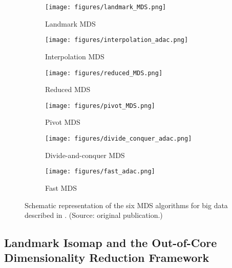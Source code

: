 \begin{figure}[ht]
    \centering
    \captionsetup[subfigure]{labelformat=empty}

    \begin{subfigure}[t]{0.3\textwidth}
        \centering
        \texttt{[image: figures/landmark\_MDS.png]}
        \caption{Landmark MDS}
        \label{fig:landmark_MDS}
    \end{subfigure}
    \hfill
    \begin{subfigure}[t]{0.3\textwidth}
        \centering
        \texttt{[image: figures/interpolation\_adac.png]}
        \caption{Interpolation MDS}
        \label{fig:interpolation_MDS}
    \end{subfigure}
    \hfill
    \begin{subfigure}[t]{0.3\textwidth}
        \centering
        \texttt{[image: figures/reduced\_MDS.png]}
        \caption{Reduced MDS}
        \label{fig:reduced_MDS}
    \end{subfigure}

    \begin{subfigure}[t]{0.3\textwidth}
        \centering
        \texttt{[image: figures/pivot\_MDS.png]}
        \caption{Pivot MDS}
        \label{fig:pivot_MDS}
    \end{subfigure}
    \hfill
    \begin{subfigure}[t]{0.3\textwidth}
        \centering
        \texttt{[image: figures/divide\_conquer\_adac.png]}
        \caption{Divide-and-conquer MDS}
        \label{fig:divide_conquer_MDS}
    \end{subfigure}
    \hfill
    \begin{subfigure}[t]{0.3\textwidth}
        \centering
        \texttt{[image: figures/fast\_adac.png]}
        \caption{Fast MDS}
        \label{fig:fast_MDS}
    \end{subfigure}
    
    \caption{Schematic representation of the six MDS algorithms for big data described in \cite{Delicado2024}. (Source: original publication.)}
    \label{fig:bigmds}
\end{figure}

\subsection{Landmark Isomap and the Out-of-Core Dimensionality Reduction Framework}

